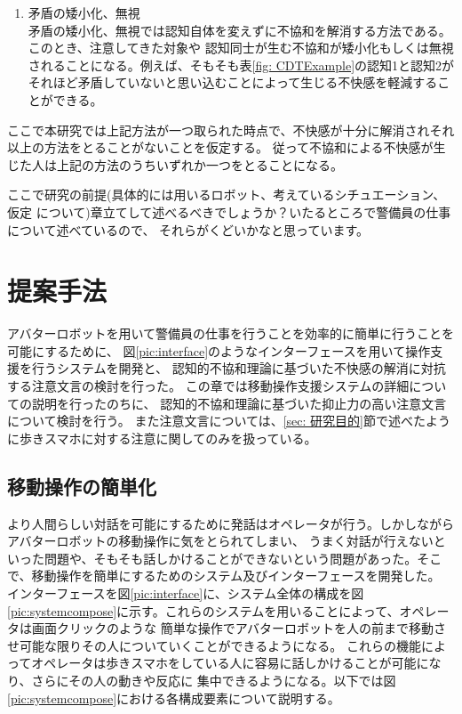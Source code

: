 \documentclass{kuisthesis}
\begin{document}
\begin{enumerate}
\begin{table}[H]
\end{table}

  \item 矛盾の矮小化、無視 \\
  矛盾の矮小化、無視では認知自体を変えずに不協和を解消する方法である。このとき、注意してきた対象や
  認知同士が生む不協和が矮小化もしくは無視されることになる。例えば、そもそも表\ref{fig: CDTExample}の認知1と認知2が
それほど矛盾していないと思い込むことによって生じる不快感を軽減することができる。

\end{enumerate}
\vspace{3mm}
ここで本研究では上記方法が一つ取られた時点で、不快感が十分に解消されそれ以上の方法をとることがないことを仮定する。
従って不協和による不快感が生じた人は上記の方法のうちいずれか一つをとることになる。

\vspace{3mm}
ここで研究の前提(具体的には用いるロボット、考えているシチュエーション、仮定
について)章立てして述べるべきでしょうか？いたるところで警備員の仕事について述べているので、
それらがくどいかなと思っています。
\vspace{3mm}

\section{提案手法}
アバターロボットを用いて警備員の仕事を行うことを効率的に簡単に行うことを可能にするために、
図\ref{pic:interface}のようなインターフェースを用いて操作支援を行うシステムを開発と、
認知的不協和理論\cite{Festinger1957}に基づいた不快感の解消に対抗する注意文言の検討を行った。
この章では移動操作支援システムの詳細についての説明を行ったのちに、
認知的不協和理論に基づいた抑止力の高い注意文言について検討を行う。
また注意文言については、\ref{sec: 研究目的}節で述べたように歩きスマホに対する注意に関してのみを扱っている。

\subsection{移動操作の簡単化}
より人間らしい対話を可能にするために発話はオペレータが行う。しかしながらアバターロボットの移動操作に気をとられてしまい、
うまく対話が行えないといった問題や、そもそも話しかけることができないという問題があった。そこで、移動操作を簡単にするためのシステム及びインターフェースを開発した。
インターフェースを図\ref{pic:interface}に、システム全体の構成を図\ref{pic:systemcompose}に示す。これらのシステムを用いることによって、オペレータは画面クリックのような
簡単な操作でアバターロボットを人の前まで移動させ可能な限りその人についていくことができるようになる。
これらの機能によってオペレータは歩きスマホをしている人に容易に話しかけることが可能になり、さらにその人の動きや反応に
集中できるようになる。以下では図\ref{pic:systemcompose}における各構成要素について説明する。
\end{document}
